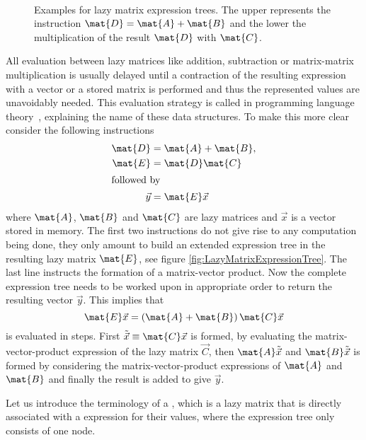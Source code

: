 \begin{figure}
	\centering
	 \\[0.8em]
	\caption[Examples for lazy matrix expression trees]
	{
		Examples for lazy matrix expression trees.
		The upper represents the instruction
		$\mat{D} = \mat{A} + \mat{B}$
		and the lower the multiplication of the result $\mat{D}$
		with $\mat{C}$.
	}
	\label{fig:LazyMatrixExpressionTree}
\end{figure}
All evaluation between lazy matrices
like addition, subtraction or matrix-matrix multiplication
is usually delayed until a contraction of the resulting
expression with a vector or a stored matrix is performed
and thus the represented values are unavoidably needed.
This evaluation strategy is called 
in programming language theory~, explaining the name of these data structures.
To make this more clear consider the following instructions
\begin{align*}
	\mat{D} &= \mat{A} + \mat{B}, \\
	\mat{E} &= \mat{D} \mat{C} \\
\intertext{followed by}
	\vec{y} &= \mat{E} \vec{x}
\end{align*}
where $\mat{A}$, $\mat{B}$ and $\mat{C}$ are lazy matrices
and $\vec{x}$ is a vector stored in memory.
The first two instructions do not give rise to any computation being done,
they only amount to build an extended expression tree in the resulting
lazy matrix $\mat{E}$, see figure \vref{fig:LazyMatrixExpressionTree}.
The last line instructs the formation of a matrix-vector product.
Now the complete expression tree needs to be worked upon in appropriate order
to return the resulting vector $\vec{y}$.
This implies that
\[ \mat{E} \vec{x} = \left( \mat{A} + \mat{B} \right) \mat{C} \vec{x} \]
is evaluated in steps.
First $\tilde{\vec{x}} \equiv \mat{C} \vec{x}$ is formed,
by evaluating the matrix-vector-product expression of the lazy matrix
$\vec{C}$,
then $\mat{A} \tilde{\vec{x}}$ and $\mat{B} \tilde{\vec{x}}$ is formed
by considering the matrix-vector-product expressions of $\mat{A}$
and $\mat{B}$ and finally the result is added to give $\vec{y}$.






Let us introduce the terminology of a ,
which is a lazy matrix
that is directly associated with a \contraction expression for their values,
\ie where the expression tree only consists of one node.







